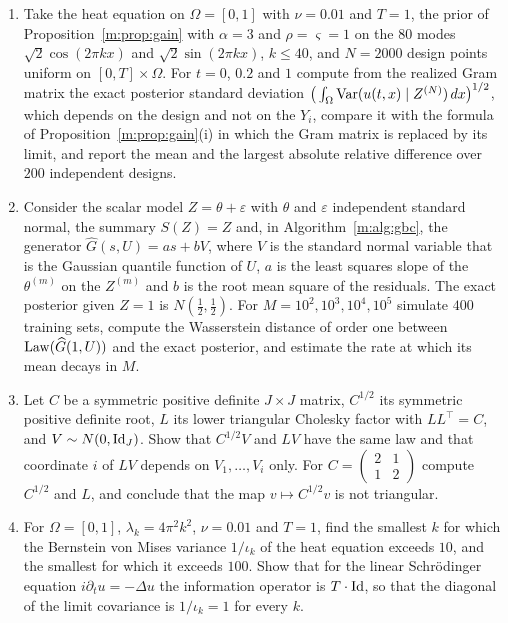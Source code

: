 \begin{enumerate}
\item Take the heat equation on $\Omega=[0,1]$ with $\nu=0.01$ and $T=1$, the prior of Proposition~\ref{m:prop:gain} with $\alpha=3$ and $\rho=\varsigma=1$ on the $80$ modes $\sqrt2\cos(2\pi kx)$ and $\sqrt2\sin(2\pi kx)$, $k\le40$, and $N=2000$ design points uniform on $[0,T]\times\Omega$. For $t=0$, $0.2$ and $1$ compute from the realized Gram matrix the exact posterior standard deviation $\big(\int_\Omega\mathrm{Var}(u(t,x)\mid Z^{(N)})\,dx\big)^{1/2}$, which depends on the design and not on the $Y_i$, compare it with the formula of Proposition~\ref{m:prop:gain}(i) in which the Gram matrix is replaced by its limit, and report the mean and the largest absolute relative difference over $200$ independent designs.
\item Consider the scalar model $Z=\theta+\varepsilon$ with $\theta$ and $\varepsilon$ independent standard normal, the summary $S(Z)=Z$ and, in Algorithm~\ref{m:alg:gbc}, the generator $\widehat G(s,U)=as+bV$, where $V$ is the standard normal variable that is the Gaussian quantile function of $U$, $a$ is the least squares slope of the $\theta^{(m)}$ on the $Z^{(m)}$ and $b$ is the root mean square of the residuals. The exact posterior given $Z=1$ is $N(\tfrac12,\tfrac12)$. For $M=10^2,10^3,10^4,10^5$ simulate $400$ training sets, compute the Wasserstein distance of order one between $\operatorname{Law}(\widehat G(1,U))$ and the exact posterior, and estimate the rate at which its mean decays in $M$.
\item Let $C$ be a symmetric positive definite $J\times J$ matrix, $C^{1/2}$ its symmetric positive definite root, $L$ its lower triangular Cholesky factor with $LL^\top=C$, and $V\sim N(0,\operatorname{Id}_J)$. Show that $C^{1/2}V$ and $LV$ have the same law and that coordinate $i$ of $LV$ depends on $V_1,\dots,V_i$ only. For $C=\begin{pmatrix}2&1\\1&2\end{pmatrix}$ compute $C^{1/2}$ and $L$, and conclude that the map $v\mapsto C^{1/2}v$ is not triangular.
\item For $\Omega=[0,1]$, $\lambda_k=4\pi^2k^2$, $\nu=0.01$ and $T=1$, find the smallest $k$ for which the Bernstein von Mises variance $1/\iota_k$ of the heat equation exceeds $10$, and the smallest for which it exceeds $100$. Show that for the linear Schr\"odinger equation $i\partial_tu=-\Delta u$ the information operator is $T\cdot\operatorname{Id}$, so that the diagonal of the limit covariance is $1/\iota_k=1$ for every $k$.
\end{enumerate}

